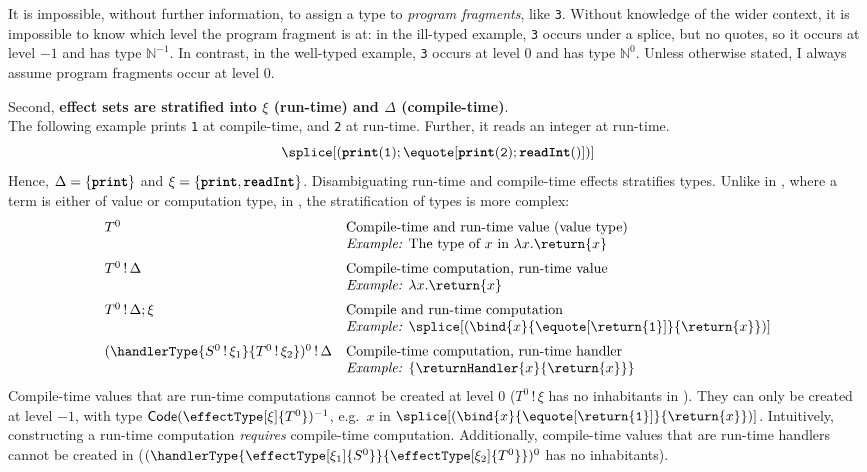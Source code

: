   It is impossible, without further information, to assign a type to \textit{program fragments}, like \texttt{3}. Without knowledge of the wider context, it is impossible to know which level the program fragment is at: in the ill-typed example, \texttt{3} occurs under a splice, but no quotes, so it occurs at level $-1$ and has type $\mathbb{N}^{-1}$. In contrast, in the well-typed example, \texttt{3} occurs at level $0$ and has type $\mathbb{N}^0$. Unless otherwise stated, I always assume program fragments occur at level $0$.

  Second, \textbf{effect sets are stratified into $\xi$ (run-time) and $\Delta$ (compile-time)}.\\
  The following example prints \texttt{1} at compile-time, and \texttt{2} at run-time. Further, it reads an integer at run-time.
\[\splice[{(\textbf{\texttt{print}}(\texttt{1}); \equote[\textbf{\texttt{print}}(\texttt{2}); \textbf{\texttt{readInt}}()])}]\]
Hence, $\Delta = \{ \textbf{\texttt{print}} \}$ and $\xi = \{ \textbf{\texttt{print}}, \textbf{\texttt{readInt}} \}$. Disambiguating run-time and compile-time effects stratifies types. Unlike in \efflang{}, where a term is either of value or computation type, in \sourceLang{}, the stratification of types is more complex:
\[\begin{array}{ll}
  T^0 & \text{Compile-time and run-time value (value type)} \\
  & \textit{Example: } \text{The type of $x$ in $\lambda x. \return{x}$}\\[2mm]
  T^0 \, ! \, \Delta  & \text{Compile-time computation, run-time value} \\
  &\textit{Example: } \lambda x. \return{x} \\[2mm]
  T^0 \, ! \, \Delta; \xi & \text{Compile and run-time computation} \\
  &\textit{Example: } \splice[(\bind{x}{\equote[\return{\texttt{1}}]}{\return{x}})] \\[2mm]
  (\handlerType{S^0 \, ! \, \xi_1}{T^0 \, ! \, \xi_2})^0\, !\, \Delta & \text{Compile-time computation, run-time handler} \\
  &\textit{Example: } \{ \returnHandler{x}{\return{x}} \}
\end{array}
\]
Compile-time values that are run-time computations cannot be created at level $0$ ($T^0 \, ! \, \xi$ has no inhabitants in \sourceLang{}). They can only be created at level $-1$, with type $\textsf{Code}(\effectType[\xi]{T^0})^{-1}$, e.g.\ $x$ in $\splice[(\bind{x}{\equote[\return{\texttt{1}}]}{\return{x}})]$. Intuitively, constructing a run-time computation \textit{requires} compile-time computation. Additionally, compile-time values that are run-time handlers cannot be created in \sourceLang{} ($(\handlerType{\effectType[\xi_1]{S^0}}{\effectType[\xi_2]{T^0}})^0$ has no inhabitants). 

